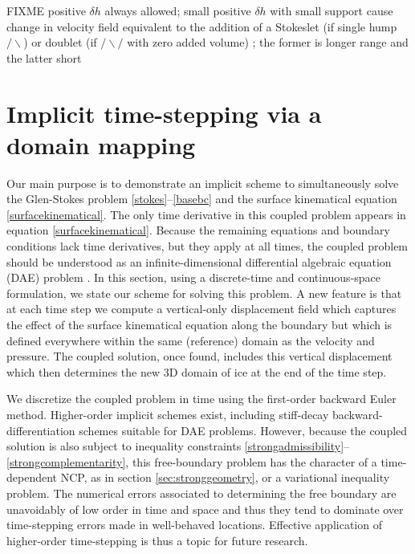 \documentclass[letterpaper,final,12pt,reqno]{amsart}
\begin{document}
FIXME positive $\delta h$ always allowed; small positive $\delta h$ with small support cause change in velocity field equivalent to the addition of a Stokeslet (if single hump $/\backslash$) or doublet (if $/\backslash/$ with zero added volume) \cite{ChwangWu1975}; the former is longer range and the latter short


\section{Implicit time-stepping via a domain mapping} \label{sec:implicitstep}

Our main purpose is to demonstrate an implicit scheme to simultaneously solve the Glen-Stokes problem \eqref{stokes}--\eqref{basebc} and the surface kinematical equation \eqref{surfacekinematical}.  The only time derivative in this coupled problem appears in equation \eqref{surfacekinematical}.  Because the remaining equations and boundary conditions lack time derivatives, but they apply at all times, the coupled problem should be understood as an infinite-dimensional differential algebraic equation (DAE) problem \cite{AscherPetzold1998}.  In this section, using a discrete-time and continuous-space formulation, we state our scheme for solving this problem.  A new feature is that at each time step we compute a vertical-only displacement field which captures the effect of the surface kinematical equation along the boundary but which is defined everywhere within the same (reference) domain as the velocity and pressure.  The coupled solution, once found, includes this vertical displacement which then determines the new 3D domain of ice at the end of the time step.

We discretize the coupled problem in time using the first-order backward Euler method.  Higher-order implicit schemes exist, including stiff-decay backward-differentiation schemes \cite{AscherPetzold1998,Bueler2021} suitable for DAE problems.  However, because the coupled solution is also subject to inequality constraints \eqref{strongadmissibility}--\eqref{strongcomplementarity}, this free-boundary problem has the character of a time-dependent NCP, as in section \ref{sec:stronggeometry}, or a variational inequality \cite{Calvoetal2002} problem.  The numerical errors associated to determining the free boundary are unavoidably of low order in time and space \cite{Bueler2020} and thus they tend to dominate over time-stepping errors made in well-behaved locations.  Effective application of higher-order time-stepping is thus a topic for future research.
\end{document}
